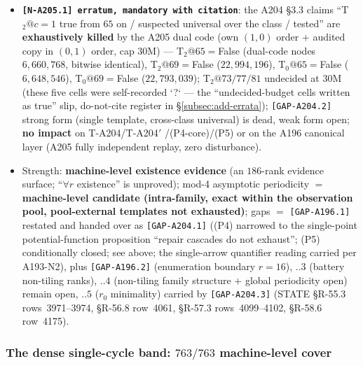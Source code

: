 \begin{itemize}
{$K=12$ reflection-type deterministic construction)}: $r=43..200$, s\_check
and tiling with zero anomalies (node median $2{,}000$, max $385{,}673$,
total $5{,}938{,}397$), a double witness together with \texttt{[CONS-A196]}
(different accounting; do not reconcile the two); the $e$-timetable drift is
the machine evidence that the ``fixed $e$-certificate'' route cannot work.
\item \textbf{\texttt{[N-A205.1] erratum, mandatory with citation}}: the
A204 \S3.3 claims ``T$_2@c=1$ true from $65$ on / suspected universal over
the class / tested'' are \textbf{exhaustively killed} by the A205 dual code
(own $(1,0)$ order $+$ audited copy in $(0,1)$ order, cap 30M) ---
T$_2@65=$False (dual-code nodes $6{,}660{,}768$, bitwise identical),
T$_2@69=$False ($22{,}994{,}196$), T$_0@65=$False ($6{,}648{,}546$),
T$_0@69=$False ($22{,}793{,}039$); T$_2@73/77/81$ undecided at 30M (these
five cells were self-recorded `?` --- the ``undecided-budget cells written
as true'' slip, do-not-cite register in \S\ref{subsec:add-errata});
\texttt{[GAP-A204.2]} strong form (single template, cross-class universal)
is dead, weak form open; \textbf{no impact} on T-A204/T-A204$'$
/(P4-core)/(P5) or on the A196 canonical layer (A205 fully independent
replay, zero disturbance).
\item Strength: \textbf{machine-level existence evidence} (an $186$-rank
evidence surface; ``$\forall r$ existence'' is unproved); mod-4 asymptotic
periodicity $=$ \textbf{machine-level candidate (intra-family, exact within
the observation pool, pool-external templates not exhausted)}; gaps $=$
\texttt{[GAP-A196.1]} restated and handed over as \texttt{[GAP-A204.1]} ((P4)
narrowed to the single-point potential-function proposition ``repair
cascades do not exhaust''; (P5) conditionally closed; see above; the
single-arrow quantifier reading carried per A193-N2), plus
\texttt{[GAP-A196.2]} (enumeration boundary $r=16$), $..3$ (battery
non-tiling ranks), $..4$ (non-tiling family structure $+$ global
periodicity open) remain open, $..5$ ($r_0$ minimality) carried by
\texttt{[GAP-A204.3]}\openlab{} (STATE \S R-55.3 rows~3971--3974, \S R-56.8
row~4061, \S R-57.3 rows~4099--4102, \S R-58.6 row~4175).
\end{itemize}

\subsubsection{The dense single-cycle band: $763/763$ machine-level cover
\tierMCA}\label{subsubsec:add-denseband}

